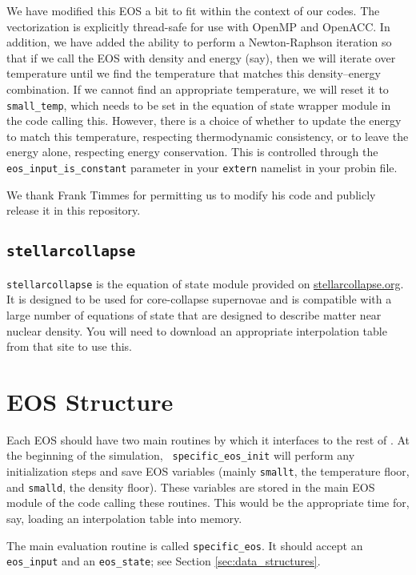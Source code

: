 We have modified this EOS a bit to fit within the context of our
codes. The vectorization is explicitly thread-safe for use with OpenMP
and OpenACC.  In addition, we have added the ability to perform a
Newton-Raphson iteration so that if we call the EOS with density and
energy (say), then we will iterate over temperature until we find the
temperature that matches this density--energy combination. If we
cannot find an appropriate temperature, we will reset it to {\tt
  small\_temp}, which needs to be set in the equation of state wrapper
module in the code calling this. However, there is a choice of whether
to update the energy to match this temperature, respecting
thermodynamic consistency, or to leave the energy alone, respecting
energy conservation. This is controlled through the
\texttt{eos\_input\_is\_constant} parameter in your \texttt{extern}
namelist in your probin file.

We thank Frank Timmes for permitting us to modify his code and
publicly release it in this repository.

\subsection {\tt stellarcollapse}

{\tt stellarcollapse} is the equation of state module provided
  on \href{stellarcollapse.org}{stellarcollapse.org}. It is designed
  to be used for core-collapse supernovae and is compatible with a
  large number of equations of state that are designed to describe
  matter near nuclear density. You will need to download an
  appropriate interpolation table from that site to use this.




\section{EOS Structure}

Each EOS should have two main routines by which it interfaces to the
rest of \castro.  At the beginning of the simulation, {\tt
  specific\_eos\_init} will perform any initialization steps and save
EOS variables (mainly \texttt{smallt}, the temperature floor, and
\texttt{smalld}, the density floor). These variables are stored in the
main EOS module of the code calling these routines. This would be the
appropriate time for, say, loading an interpolation table into memory.

The main evaluation routine is called {\tt specific\_eos}. It should
accept an {\tt eos\_input} and an {\tt eos\_state}; see Section
\ref{sec:data_structures}.
